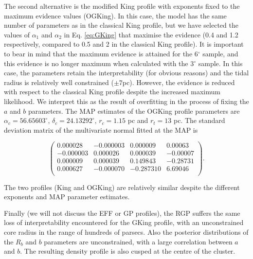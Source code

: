 The second alternative is the modified King profile with exponents fixed to the maximum evidence values (OGKing). In this case, the model has the same number of parameters as in the classical King profile, but we have selected the values of $\alpha_1$ and $\alpha_2$ in Eq. \ref{eq:GKing} that maximise the evidence (0.4 and 1.2 respectively, compared to 0.5 and 2 in the classical King profile). It is important to bear in mind that the maximum evidence is attained for the 6$^{\circ}$ sample, and this evidence is no longer maximum when calculated with the 3$^{\circ}$ sample. In this case, the parameters retain the interpretability (for obvious reasons) and the tidal radius is relatively well constrained ($\pm 7$pc). However, the evidence is reduced with respect to the classical King profile despite the increased maximum likelihood. We interpret this as the result of overfitting in the process of fixing the $a$ and $b$ parameters. The MAP estimates of the OGKing profile parameters are $\alpha_c=56.65603^{\circ}$, $\delta_c=24.13292^{\circ}$, $r_c=1.15$ pc and $r_t=13$ pc. The standard deviation matrix of the multivariate normal fitted at the MAP is 

$$
\left(\begin{array}{rrrr}
 0.000028 &-0.000003 & 0.000009 & 0.00063\\
-0.000003 & 0.000026 & 0.000039 &-0.00007\\
 0.000009 & 0.000039 & 0.149843 &-0.28731\\
 0.000627 &-0.000070 &-0.287310 & 6.69046\\
\end{array}\right).
$$


The two profiles (King and OGKing) are relatively similar despite the different exponents and MAP parameter estimates. 

Finally (we will not discuss the EFF or GP profiles), the RGP suffers the same loss of interpretability encountered for the GKing profile, with an unconstrained core radius in the range of hundreds of parsecs. Also the posterior distributions of the $R_b$ and $b$ parameters are unconstrained, with a large correlation between $a$ and $b$. The resulting density profile is also cusped at the centre of the cluster. 


